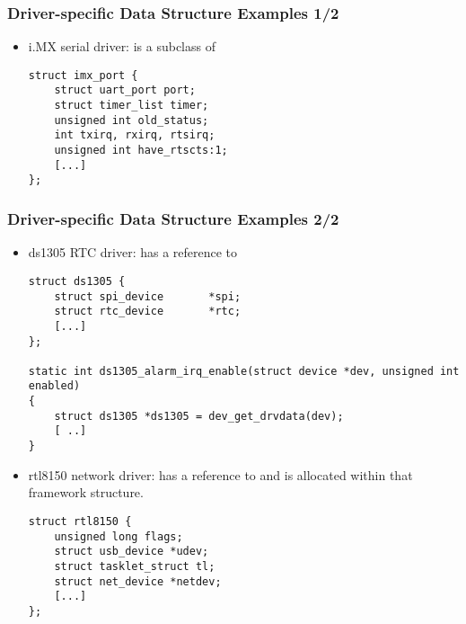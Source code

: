 \begin{frame}[fragile]
  \frametitle{Driver-specific Data Structure Examples 1/2}
  \begin{itemize}
  \item i.MX serial driver:  is a subclass of
  \begin{verbatim}
struct imx_port {
    struct uart_port port;
    struct timer_list timer;
    unsigned int old_status;
    int txirq, rxirq, rtsirq;
    unsigned int have_rtscts:1;
    [...]
};
  \end{verbatim}
  \end{itemize}
\end{frame}

\begin{frame}[fragile]
  \frametitle{Driver-specific Data Structure Examples 2/2}
  \begin{itemize}
  \item ds1305 RTC driver:  has a reference to
  \begin{verbatim}
struct ds1305 {
    struct spi_device       *spi;
    struct rtc_device       *rtc;
    [...]
};

static int ds1305_alarm_irq_enable(struct device *dev, unsigned int enabled)
{
    struct ds1305 *ds1305 = dev_get_drvdata(dev);
    [ ..]
}
  \end{verbatim}
  \item rtl8150 network driver:  has a reference to
     and is allocated within that framework structure.
  \begin{verbatim}
struct rtl8150 {
    unsigned long flags;
    struct usb_device *udev;
    struct tasklet_struct tl;
    struct net_device *netdev;
    [...]
};
  \end{verbatim}
  \end{itemize}
\end{frame}

